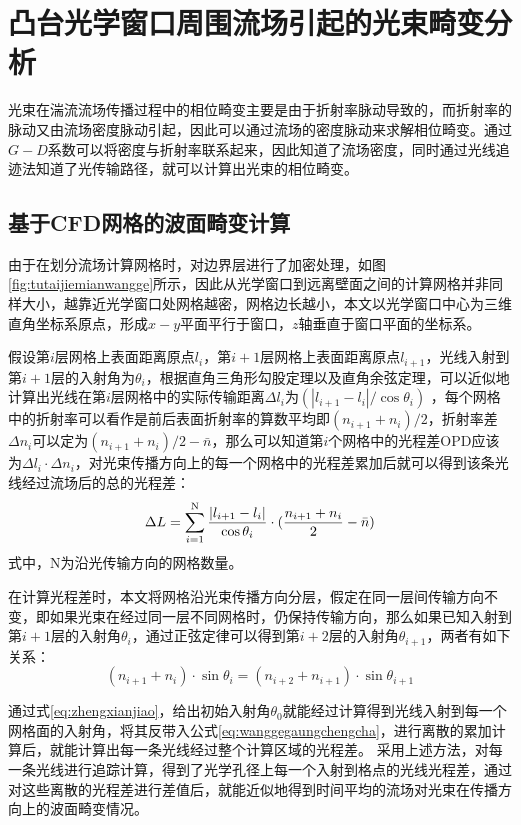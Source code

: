 \section{凸台光学窗口周围流场引起的光束畸变分析}
光束在湍流流场传播过程中的相位畸变主要是由于折射率脉动导致的，而折射率的脉动又由流场密度脉动引起，因此可以通过流场的密度脉动来求解相位畸变。通过$G-D$系数可以将密度与折射率联系起来，因此知道了流场密度，同时通过光线追迹法知道了光传输路径，就可以计算出光束的相位畸变。
\subsection{基于CFD网格的波面畸变计算}
由于在划分流场计算网格时，对边界层进行了加密处理，如图\ref{fig:tutaijiemianwangge}所示，因此从光学窗口到远离壁面之间的计算网格并非同样大小，越靠近光学窗口处网格越密，网格边长越小，本文以光学窗口中心为三维直角坐标系原点，形成$x-y$平面平行于窗口，$z$轴垂直于窗口平面的坐标系。

假设第$i$层网格上表面距离原点$l_i$，第$i+1$层网格上表面距离原点$l_{i+1}$，光线入射到第$i+1$层的入射角为$\theta_i$，根据直角三角形勾股定理以及直角余弦定理，可以近似地计算出光线在第$i$层网格中的实际传输距离$\Delta l_i$为$(|l_{i+1}-l_i|/\cos\theta_i)$
，每个网格中的折射率可以看作是前后表面折射率的算数平均即$(n_{i+1}+n_i)/2$，折射率差$\Delta n_i$可以定为$(n_{i+1}+n_i)/2-\bar{n}$，那么可以知道第$i$个网格中的光程差OPD应该为$\Delta l_i\cdot\Delta n_i$，对光束传播方向上的每一个网格中的光程差累加后就可以得到该条光线经过流场后的总的光程差：
\begin{equation}
\Delta L=\sum\limits_{i=1}^{\rm N}\frac{|l_{i+1}-l_i|}{\cos\theta_i}\cdot(\frac{n_{i+1}+n_i}{2}-\bar{n})
\label{eq:wanggegaungchengcha}
\end{equation}
式中，N为沿光传输方向的网格数量。

在计算光程差时，本文将网格沿光束传播方向分层，假定在同一层间传输方向不变，即如果光束在经过同一层不同网格时，仍保持传输方向，那么如果已知入射到第$i+1$层的入射角$\theta_i$，通过正弦定律可以得到第$i+2$层的入射角$\theta_{i+1}$，两者有如下关系：
\begin{equation}
(n_{i+1}+n_i)\cdot\sin\theta_i=(n_{i+2}+n_{i+1})\cdot\sin\theta_{i+1}
\label{eq:zhengxianjiao}
\end{equation}

通过式\eqref{eq:zhengxianjiao}，给出初始入射角$\theta_0$就能经过计算得到光线入射到每一个网格面的入射角，将其反带入公式\eqref{eq:wanggegaungchengcha}，进行离散的累加计算后，就能计算出每一条光线经过整个计算区域的光程差。
采用上述方法，对每一条光线进行追踪计算，得到了光学孔径上每一个入射到格点的光线光程差，通过对这些离散的光程差进行差值后，就能近似地得到时间平均的流场对光束在传播方向上的波面畸变情况。


